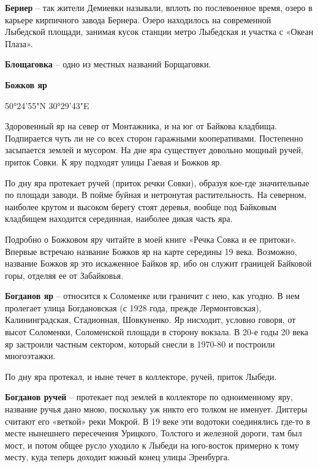 \medskip


\textbf{Бернер} – так жители Демиевки называли, вплоть по послевоенное время, озеро в карьере кирпичного завода Бернера. Озеро находилось на современной Лыбедской площади, занимая кусок станции метро Лыбедская и участка с «Океан Плаза».\\ 

\medskip

\textbf{Блощаговка} – одно из местных названий Борщаговки.\\

\medskip

\textbf{Божков яр} 

50°24'55"N 30°29'43"E

Здоровенный яр на север от Монтажника, и на юг от Байкова кладбища. Подпирается чуть ли не со всех сторон гаражными кооперативами. Постепенно засыпается землей и мусором. На дне яра существует довольно мощный ручей, приток Совки. К яру подходят улицы Гаевая и Божков яр. 

По дну яра протекает ручей (приток речки Совки), образуя кое-где значительные по площади заводи. В пойме буйная и нетронутая растительность. На северном, наиболее крутом и высоком берегу стоят деревья, вообще под Байковым кладбищем находится серединная, наиболее дикая часть яра.

Подробно о Божковом яру читайте в моей книге «Речка Совка и ее притоки». Впервые встречаю название Божков яр на карте середины 19 века. Возможно, название Божков яр это искаженное Байков яр, ибо он служит границей Байковой горы, отделяя ее от Забайковья.\\

\medskip

\textbf{Богданов яр} – относится к Соломенке или граничит с нею, как угодно. В нем пролегает улица Богдановская (с 1928 года, прежде Лермонтовская), Калининградская, Стадионная, Шовкуненко. Яр нисходит, условно говоря, от высот Соломенки, Соломенской площади в сторону вокзала. В 20-е годы 20 века яр застроили частным сектором, который снесли в 1970-80 и построили многоэтажки.

По дну яра протекал, и ныне течет в коллекторе, ручей, приток Лыбеди.\\ 

\medskip

\textbf{Богданов ручей} – протекает под землей в коллекторе по одноименному яру, название ручья дано мною, поскольку уж никто его толком не именует. Диггеры считают его «веткой» реки Мокрой. В 19 веке эти водотоки соединялись где-то в месте нынешнего пересечения Урицкого, Толстого и железной дороги, там был мост, и потом общее русло уходило к Лыбеди на юго-восток примерно к тому месту, куда теперь доходит южный конец улицы Эренбурга.

